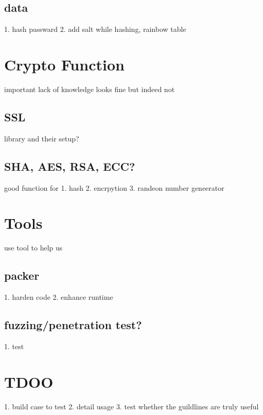 \documentclass[12pt, a4paper]{article}
\begin{document}
\subsection{data}
1. hash passward
2. add salt while hashing, rainbow table


%   
\section{Crypto Function}
important
lack of knowledge
looks fine but indeed not

\subsection{SSL}
library and their setup?

\subsection{SHA, AES, RSA, ECC?}
good function for
1. hash
2. encrpytion
3. randeon number geneerator

%   
\section{Tools}
use tool to help us
\subsection{packer}
1. harden code
2. enhance runtime
\subsection{fuzzing/penetration test?}
1. test

\section{TDOO}
1. build case to test
2. detail usage
3. test whether the guildlines are truly useful



\end{document}
